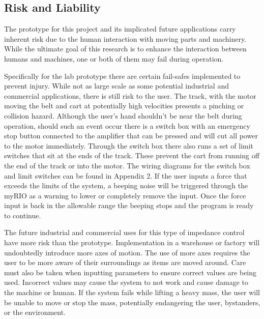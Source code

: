 
\subsection*{Risk and Liability}
The prototype for this project and its implicated future applications carry inherent risk due to the human interaction with moving parts and machinery. While the ultimate goal of this research is to enhance the interaction between humans and machines, one or both of them may fail during operation.

Specifically for the lab prototype there are certain fail-safes implemented to prevent injury. While not as large scale as some potential industrial and commercial applications, there is still risk to the user. The track, with the motor moving the belt and cart at potentially high velocities presents a pinching or collision hazard. Although the user's hand shouldn't be near the belt during operation, should such an event occur there is a switch box with an emergency stop button connected to the amplifier that can be pressed and will cut all power to the motor immediately. Through the switch box there also runs a set of limit switches that sit at the ends of the track. These prevent the cart from running off the end of the track or into the motor. The wiring diagrams for the switch box and limit switches can be found in Appendix 2. If the user inputs a force that exceeds the limits of the system, a beeping noise will be triggered through the myRIO as a warning to lower or completely remove the input. Once the force input is back in the allowable range the beeping stops and the program is ready to continue.

The future industrial and commercial uses for this type of impedance control have more risk than the prototype. Implementation in a warehouse or factory will undoubtedly introduce more axes of motion. The use of more axes requires the user to be more aware of their surroundings as items are moved around. Care must also be taken when inputting parameters to ensure correct values are being used. Incorrect values may cause the system to not work and cause damage to the machine or human. If the system fails while lifting a heavy mass, the user will be unable to move or stop the mass, potentially endangering the user, bystanders, or the environment.

